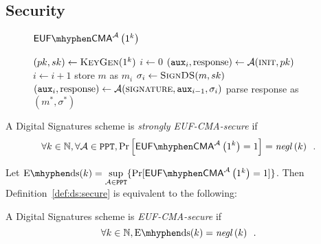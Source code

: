   \subsection{Security}
    \begin{figure}[H]
      \begin{gamebox}{$\mathsf{EUF \mhyphen CMA}^{\adversary}\left(1^k\right)$}
        \begin{algorithmic}[1]
          \State $(pk, sk) \gets \textsc{KeyGen}(1^k)$
          \State $i \gets 0$
          \State $(\mathtt{aux}_i, \mathrm{response}) \gets
          \mathcal{A}(\textsc{init}, pk)$
            \State $i \gets i + 1$
            \State store $m$ as $m_i$
            \State $\sigma_i \gets \textsc{SignDS}(m, sk)$
            \State $(\mathtt{aux}_i, \mathrm{response}) \gets
            \mathcal{A}(\textsc{signature}, \mathtt{aux}_{i-1}, \sigma_i)$
          \EndWhile
          \State parse response as $(m^*, \sigma^*)$
            \State {}
          \Else
            \State {}
          \EndIf
        \end{algorithmic}
      \end{gamebox}
      \caption{}
      \label{game:ds}
    \end{figure}
    \begin{definition}
      \label{def:ds:secure}
      A Digital Signatures scheme is \emph{strongly \textsf{EUF-CMA}-secure} if
      \begin{equation*}
        \forall k \in \mathbb{N}, \forall \adversary \in \mathtt{PPT},
        \Pr\left[\mathsf{EUF \mhyphen CMA}^{\adversary}\left(1^k\right) =
        1\right] = \mathit{negl}\left(k\right) \enspace.
      \end{equation*}
    \end{definition}

    Let $\mathrm{E \mhyphen ds}(k) = \underset{\adversary \in
    \mathtt{PPT}}{\sup}\{\Pr[\mathsf{EUF \mhyphen
    CMA}^{\adversary}\left(1^k\right) = 1]\}$. Then
    Definition~\ref{def:ds:secure} is equivalent to the following:

    \begin{definition}
      \label{def:ds:secure:sup}
      A Digital Signatures scheme is \emph{\textsf{EUF-CMA}-secure} if
      \begin{equation*}
        \forall k \in \mathbb{N}, \mathrm{E \mhyphen ds}(k) =
        \mathit{negl}\left(k\right) \enspace.
      \end{equation*}
    \end{definition}
